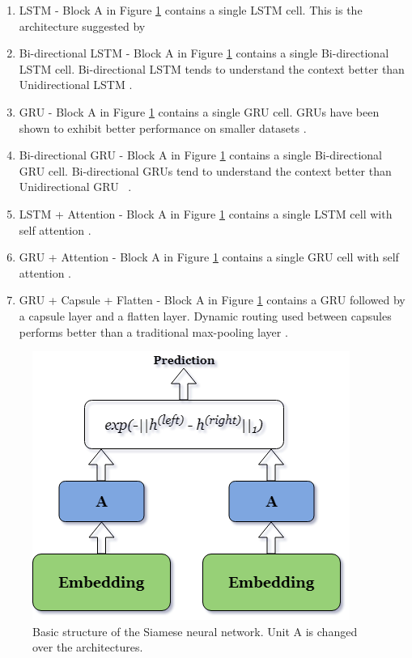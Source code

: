 \begin{enumerate}
	\item LSTM - Block A in Figure \ref{fig:siamese} contains a single LSTM cell. This is the architecture suggested by \citet{Mueller_Thyagarajan_2016} 
	
	\item Bi-directional LSTM - Block A in Figure \ref{fig:siamese} contains a single Bi-directional LSTM cell. Bi-directional LSTM tends to understand the context better than Unidirectional LSTM \cite{650093}.
	
	\item GRU - Block A in Figure \ref{fig:siamese} contains a single GRU cell. GRUs have been shown to exhibit better performance on smaller datasets \cite{Chung2014EmpiricalEO}. 
	
	\item Bi-directional GRU - Block A in Figure \ref{fig:siamese} contains a single Bi-directional GRU cell. Bi-directional GRUs tend to understand the context better than Unidirectional GRU ~\cite{vukotic:hal-01351733}.
	
	\item LSTM + Attention - Block A in Figure \ref{fig:siamese} contains a single LSTM cell with self attention \cite{NIPS2017_3f5ee243}.
	
	\item GRU + Attention - Block A in Figure \ref{fig:siamese} contains a single GRU cell with self attention \cite{NIPS2017_3f5ee243}.
	
	\item GRU + Capsule + Flatten - Block A in Figure \ref{fig:siamese} contains a GRU followed by a capsule layer and a flatten layer. Dynamic routing used between capsules performs better than a traditional max-pooling layer \cite{NIPS2017_2cad8fa4}.
	
\end{enumerate}

\begin{figure}[ht]
	\centering
	\includegraphics[scale=0.5]{figures/semantic_textual_similarity/siamese_neural_networks/siamese_architecture.png}
	\caption[Basic structure of the Siamese neural network]{Basic structure of the Siamese neural network. Unit A is changed over the architectures.}
	\label{fig:siamese}
\end{figure}
	
